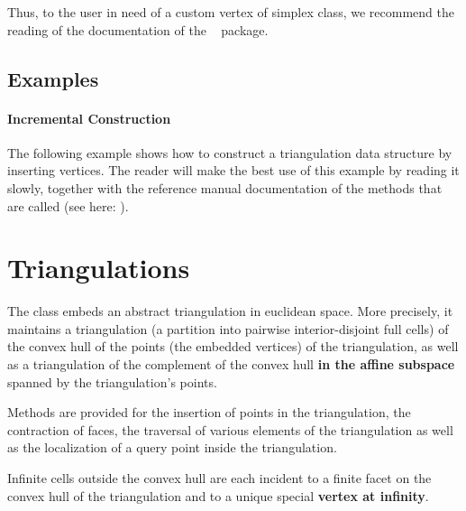 {{\begin{ccAdvanced}
Thus, to the user in need of a custom vertex of simplex class, we recommend
the reading of the documentation of the \cgal\  package.
\end{ccAdvanced}


\subsection{Examples\label{triangulation:tds:examples}}
 
\paragraph{Incremental Construction}
The following example shows how to construct a triangulation data structure by
inserting vertices. The reader will make the best use of this example by
reading it slowly, together with the reference manual documentation of the
methods that are called (see here: ).




\section{Triangulations}

The class  embeds an abstract 
triangulation in euclidean space. More precisely, it
maintains a triangulation (a partition into pairwise interior-disjoint full
cells) of the convex hull of the points (the embedded vertices) of the
triangulation, as well as a triangulation of the complement of the convex hull
\textbf{in the affine subspace} spanned by the triangulation's points.

Methods are provided for the insertion of points in the triangulation, the
contraction of faces, the traversal of various elements of the triangulation
as well as the localization of a query point inside the triangulation.

Infinite cells outside the convex hull are each incident to
a finite facet on the convex hull of the triangulation and to a unique special
\textbf{vertex at infinity}. 

}}
